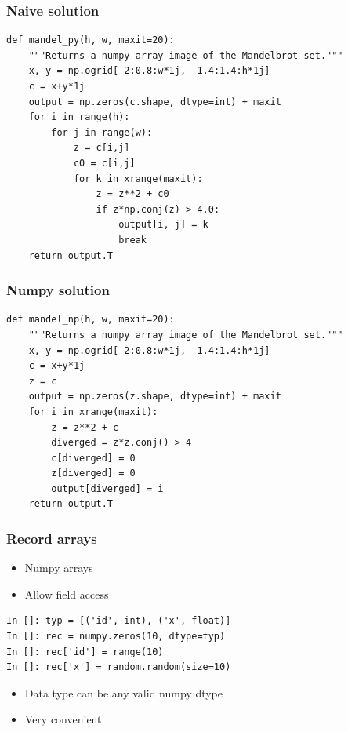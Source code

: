 \documentclass[14pt,compress]{beamer}
\begin{document}
\begin{frame}
    \small
    \vspace*{-0.25in}
  \frametitle{Naive solution}
  \begin{lstlisting}
def mandel_py(h, w, maxit=20):
    """Returns a numpy array image of the Mandelbrot set."""
    x, y = np.ogrid[-2:0.8:w*1j, -1.4:1.4:h*1j]
    c = x+y*1j
    output = np.zeros(c.shape, dtype=int) + maxit
    for i in range(h):
        for j in range(w):
            z = c[i,j]
            c0 = c[i,j]
            for k in xrange(maxit):
                z = z**2 + c0
                if z*np.conj(z) > 4.0:
                    output[i, j] = k
                    break
    return output.T
  \end{lstlisting}
\end{frame}

\begin{frame}
  \frametitle{Numpy solution}
  \small
  \begin{lstlisting}
def mandel_np(h, w, maxit=20):
    """Returns a numpy array image of the Mandelbrot set."""
    x, y = np.ogrid[-2:0.8:w*1j, -1.4:1.4:h*1j]
    c = x+y*1j
    z = c
    output = np.zeros(z.shape, dtype=int) + maxit
    for i in xrange(maxit):
        z = z**2 + c
        diverged = z*z.conj() > 4
        c[diverged] = 0
        z[diverged] = 0
        output[diverged] = i
    return output.T
  \end{lstlisting}
\end{frame}


\begin{frame}[fragile]
    \frametitle{Record arrays}
    \begin{itemize}
        \item Numpy arrays
        \item Allow field access 
    \end{itemize}
    \begin{lstlisting}
In []: typ = [('id', int), ('x', float)]
In []: rec = numpy.zeros(10, dtype=typ)
In []: rec['id'] = range(10)
In []: rec['x'] = random.random(size=10)
    \end{lstlisting}
    \begin{itemize}
        \item Data type can be any valid numpy dtype
        \item Very convenient
    \end{itemize}
\end{frame}
\end{document}
